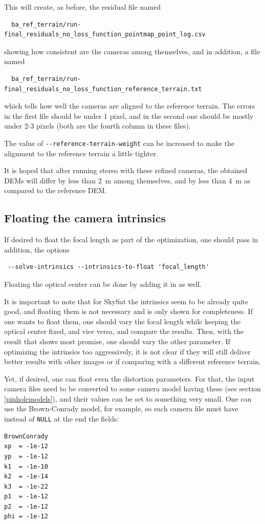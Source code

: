 This will create, as before, the residual file named
\begin{verbatim}
  ba_ref_terrain/run-final_residuals_no_loss_function_pointmap_point_log.csv
\end{verbatim}
showing how consistent are the cameras among themselves, 
and in addition, a file named
\begin{verbatim}
  ba_ref_terrain/run-final_residuals_no_loss_function_reference_terrain.txt
\end{verbatim}

which tells how well the cameras are aligned to the reference
terrain. The errors in the first file should be under 1 pixel, and in
the second one should be mostly under 2-3 pixels (both are the fourth
column in these files).

The value of \texttt{-\/-reference-terrain-weight} can be increased to make the 
alignment to the reference terrain a little tighter.

It is hoped that after running stereo with these refined cameras, the obtained DEMs
will differ by less than 2~m among themselves, and by less than 4~m as compared
to the reference DEM. 

\subsection{Floating the camera intrinsics}

If desired to float the focal length as part of the optimization, one should 
pass in addition, the options
\begin{verbatim}
 --solve-intrinsics --intrinsics-to-float 'focal_length'
\end{verbatim}
Floating the optical center can be done by adding it in as well. 

It is important to note that for SkySat the intrinsics seem to be already quite good,
and floating them is not necessary and is only shown for completeness. If 
one wants to float them, one should vary the focal length while keeping the optical center
fixed, and vice versa, and compare the results. Then, with the result that shows most
promise, one should vary the other parameter. If optimizing the intrinsics too aggressively,
it is not clear if they will still deliver better results with other images or 
if comparing with a different reference terrain. 

Yet, if desired, one can float even the distortion parameters. 
For that, the input camera files need to be converted
to some camera model having these (see section \ref{pinholemodels}), 
and their values can be set to something very small.
One can use the Brown-Conrady model, for example, so each camera file must have
instead of \texttt{NULL} at the end the fields:
\begin{verbatim}
BrownConrady
xp  = -1e-12
yp  = -1e-12
k1  = -1e-10
k2  = -1e-14
k3  = -1e-22
p1  = -1e-12
p2  = -1e-12
phi = -1e-12
\end{verbatim}

